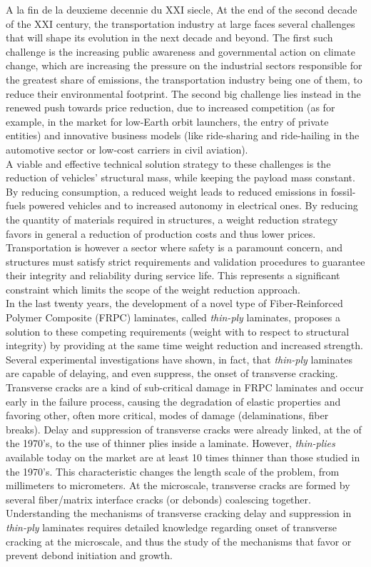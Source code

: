 A la fin de la deuxieme decennie du XXI siecle, 
At the end of the second decade of the XXI century, the transportation industry at large faces several challenges that will shape its evolution in the next decade and beyond. The first such challenge is the increasing public awareness and governmental action on climate change, which are increasing the pressure on the industrial sectors responsible for the greatest share of emissions, the transportation industry being one of them, to reduce their environmental footprint. The second big challenge lies instead in the renewed push towards price reduction, due to increased competition (as for example, in the market for low-Earth orbit launchers, the entry of private entities) and innovative business models (like ride-sharing and ride-hailing in the automotive sector or low-cost carriers in civil aviation).\\
A viable and effective technical solution strategy to these challenges is the reduction of vehicles' structural mass, while keeping the payload mass constant. By reducing consumption, a reduced weight leads to reduced emissions in fossil-fuels powered vehicles and to increased autonomy in electrical ones. By reducing the quantity of materials required in structures, a weight reduction strategy favors in general a reduction of production costs and thus lower prices. Transportation is however a sector where safety is a paramount concern, and structures must satisfy strict requirements and validation procedures to guarantee their integrity and reliability during service life. This represents a significant constraint which limits the scope of the weight reduction approach.\\
In the last twenty years, the development of a novel type of Fiber-Reinforced Polymer Composite (FRPC) laminates, called \emph{thin-ply} laminates, proposes a solution to these competing requirements (weight with to respect to structural integrity) by providing at the same time weight reduction and increased strength. Several experimental investigations have shown, in fact, that \emph{thin-ply} laminates are capable of delaying, and even suppress, the onset of transverse cracking. Transverse cracks are a kind of sub-critical damage in FRPC laminates and occur early in the failure process, causing the degradation of elastic properties and favoring other, often more critical, modes of damage (delaminations, fiber breaks). Delay and suppression of transverse cracks were already linked, at the of the 1970's, to the use of thinner plies inside a laminate. However, \emph{thin-plies} available today on the market are at least 10 times thinner than those studied in the 1970's. This characteristic changes the length scale of the problem, from millimeters to micrometers. At the microscale, transverse cracks are formed by several fiber/matrix interface cracks (or debonds) coalescing together. Understanding the mechanisms of transverse cracking delay and suppression in \emph{thin-ply} laminates requires detailed knowledge regarding onset of transverse cracking at the microscale, and thus the study of the mechanisms that favor or prevent debond initiation and growth.\\
